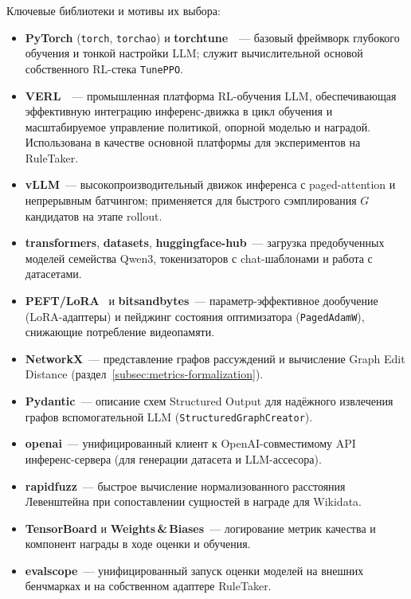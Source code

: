 Ключевые библиотеки и мотивы их выбора:
\begin{itemize}
    \setlength{\itemsep}{\smallskipamount}
    \item \textbf{PyTorch} (\texttt{torch}, \texttt{torchao}) и \textbf{torchtune}~\cite{torchtune2024}~--- базовый фреймворк глубокого обучения и тонкой настройки LLM; служит вычислительной основой собственного RL-стека \texttt{TunePPO}.
    \item \textbf{VERL}~\cite{sheng2024verl}~--- промышленная платформа RL-обучения LLM, обеспечивающая эффективную интеграцию инференс-движка в цикл обучения и масштабируемое управление политикой, опорной моделью и наградой. Использована в качестве основной платформы для экспериментов на RuleTaker.
    \item \textbf{vLLM}~--- высокопроизводительный движок инференса с paged-attention и непрерывным батчингом; применяется для быстрого сэмплирования $G$ кандидатов на этапе rollout.
    \item \textbf{transformers}, \textbf{datasets}, \textbf{huggingface-hub}~--- загрузка предобученных моделей семейства Qwen3, токенизаторов с chat-шаблонами и работа с датасетами.
    \item \textbf{PEFT/LoRA}~\cite{hu2022lora} и \textbf{bitsandbytes}~--- параметр-эффективное дообучение (LoRA-адаптеры) и пейджинг состояния оптимизатора (\texttt{PagedAdamW}), снижающие потребление видеопамяти.
    \item \textbf{NetworkX}~--- представление графов рассуждений и вычисление Graph Edit Distance (раздел~\ref{subsec:metrics-formalization}).
    \item \textbf{Pydantic}~--- описание схем Structured Output для надёжного извлечения графов вспомогательной LLM (\texttt{StructuredGraphCreator}).
    \item \textbf{openai}~--- унифицированный клиент к OpenAI-совместимому API инференс-сервера (для генерации датасета и LLM-ассесора).
    \item \textbf{rapidfuzz}~--- быстрое вычисление нормализованного расстояния Левенштейна при сопоставлении сущностей в награде для Wikidata.
    \item \textbf{TensorBoard} и \textbf{Weights\,\&\,Biases}~--- логирование метрик качества и компонент награды в ходе оценки и обучения.
    \item \textbf{evalscope}~--- унифицированный запуск оценки моделей на внешних бенчмарках и на собственном адаптере RuleTaker.
\end{itemize}

